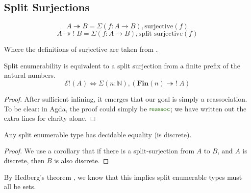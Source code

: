 \subsection{Split Surjections}
\begin{rm-definition}[Surjections]
  \begin{multicols}{2}
    \begin{equation}
      A \twoheadrightarrow B = \Sigma (f : A \rightarrow B) , \text{surjective}(f)
    \end{equation} \break
    \begin{equation}
      A \twoheadrightarrow! \; B = \Sigma (f : A \rightarrow B) , \text{split surjective}(f)
    \end{equation}
  \end{multicols}
  Where the definitions of surjective are taken from \cite[definition
  4.6.1]{hottbook}.
\end{rm-definition}
\begin{rm-theorem} \label{split-enum-surj}
  Split enumerability is equivalent to a split surjection from a finite prefix
  of the natural numbers.
  \begin{equation}
    \mathcal{E}!(A) \iff \Sigma {(n : \mathbb{N})} , \left( \mathbf{Fin}(n) \twoheadrightarrow ! \; A \right)
  \end{equation}
\end{rm-theorem}
\begin{proof}
  After sufficient inlining, it emerges that our goal is simply a reassociation.
  To be clear: in Agda, the proof could simply be \(\AgdaFunction{reassoc}\); we
  have written out the extra lines for clarity alone.
\end{proof}
\begin{rm-lemma} \label{split-enum-discrete}
  Any split enumerable type has decidable equality (is discrete).
\end{rm-lemma}
\begin{proof}
  We use a corollary that if there is a split-surjection from \(A\) to \(B\),
  and \(A\) is discrete, then \(B\) is also discrete.
\end{proof}
By Hedberg's theorem \cite{hedbergCoherenceTheoremMartinLof1998}, we know that
this implies split enumerable types must all be sets.
